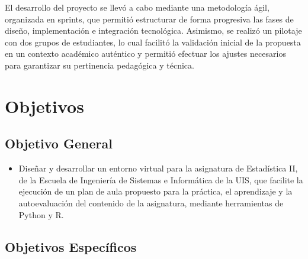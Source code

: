 \documentclass[letter,oneside,12pt,spanish]{report}
\begin{document}
El desarrollo del proyecto se llevó a cabo mediante una metodología ágil, organizada en sprints, que permitió estructurar de forma progresiva las fases de diseño, implementación e integración tecnológica. Asimismo, se realizó un pilotaje con dos grupos de estudiantes, lo cual facilitó la validación inicial de la propuesta en un contexto académico auténtico y permitió efectuar los ajustes necesarios para garantizar su pertinencia pedagógica y técnica.



\newpage


\chapter{Objetivos}

\section{Objetivo General}

\begin{itemize}
    \item Diseñar y desarrollar un entorno virtual para la asignatura de Estadística II, de la Escuela de Ingeniería de Sistemas e 
    Informática de la UIS, que facilite la ejecución de un plan de aula propuesto para la práctica, el aprendizaje y la autoevaluación 
    del contenido de la asignatura, mediante herramientas de Python y R.
\end{itemize}

\section{Objetivos Específicos}
\end{document}

